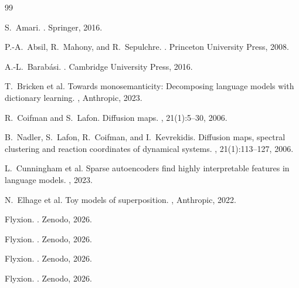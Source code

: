 \documentclass[12pt, a4paper]{article}
\theoremstyle{plain}
\theoremstyle{definition}
\theoremstyle{remark}
\begin{document}
\begin{thebibliography}{99}

S.~Amari.
.
\newblock Springer, 2016.

P.-A.~Absil, R.~Mahony, and R.~Sepulchre.
.
\newblock Princeton University Press, 2008.

A.-L.~Barab\'{a}si.
.
\newblock Cambridge University Press, 2016.

T.~Bricken et al.
\newblock Towards monosemanticity: Decomposing language models with dictionary
  learning.
, Anthropic, 2023.

R.~Coifman and S.~Lafon.
\newblock Diffusion maps.
,
  21(1):5--30, 2006.

B.~Nadler, S.~Lafon, R.~Coifman, and I.~Kevrekidis.
\newblock Diffusion maps, spectral clustering and reaction coordinates of
  dynamical systems.
, 21(1):113--127,
  2006.

L.~Cunningham et al.
\newblock Sparse autoencoders find highly interpretable features in language
  models.
, 2023.

N.~Elhage et al.
\newblock Toy models of superposition.
, Anthropic, 2022.

Flyxion.
.
\newblock Zenodo, 2026.

Flyxion.
.
\newblock Zenodo, 2026.

Flyxion.
.
\newblock Zenodo, 2026.

Flyxion.
.
\newblock Zenodo, 2026.


\end{thebibliography}
\end{document}
